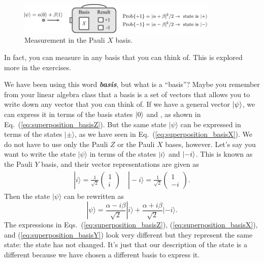 \begin{figure}[H]
    \centering
    \includegraphics[width=0.85\textwidth]{lesson2/2-2_measurement_X.pdf}
    \caption{Measurement in the Pauli $X$ basis.}
    \label{fig:x-meas}
\end{figure}

In fact, you can measure in any basis that you can think of.  This is explored more in the exercises.

We have been using this word \textbf{\emph{basis}}, but what is a ``basis''? Maybe you remember from your linear algebra class that a basis is a set of vectors that allows you to write down any vector that you can think of. If we have a general vector $\left| \psi \right\rangle$, we can express it in terms of the basis states $\left| 0 \right\rangle$ and , as shown in Eq.~(\ref{eq:superposition_basisZ}).
But the same state $|\psi\rangle$ can be expressed in terms of the states $|\pm\rangle$, as we have seen in Eq.~(\ref{eq:superposition_basisX}).
We do not have to use only the Pauli $Z$ or the Pauli $X$ bases, however.
Let's say you want to write the state $|\psi\rangle$ in terms of the states $\left| i \right\rangle$ and $\left| -i \right\rangle$.
This is known as the Pauli $Y$ basis, and their vector representations are given as
\begin{align}
    |i\rangle=\frac{1}{\sqrt{2}}\left(\begin{array}{l}1 \\ i\end{array}\right) \quad|-i\rangle=\frac{1}{\sqrt{2}}\left(\begin{array}{c}1 \\ -i\end{array}\right).
    \label{eq:Pauli_Y_basis}
\end{align}
Then the state $|\psi\rangle$ can be rewritten as
\begin{equation}
    |\psi\rangle=\frac{\alpha-i \beta}{\sqrt{2}}|i\rangle+\frac{\alpha+i \beta}{\sqrt{2}}|-i\rangle.
    \label{eq:superposition_basisY}
\end{equation}
The expressions in Eqs.~(\ref{eq:superposition_basisZ}), (\ref{eq:superposition_basisX}), and (\ref{eq:superposition_basisY}) look very different but they represent the same state: the state has not changed.
It's just that our description of the state is a different because we have chosen a different basis to express it.

